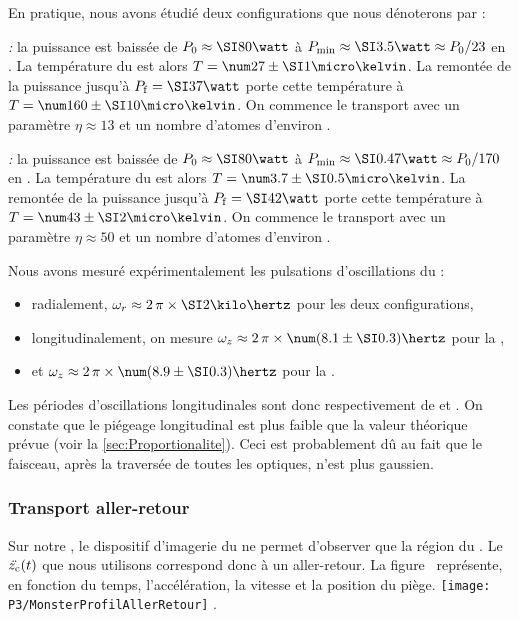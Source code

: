 \vspace{5pt}
\noindent En pratique, nous avons étudié deux configurations que nous dénoterons par :
\begin{ditemize}
	\item \emph{\confa:} la puissance est baissée de $P_0\approx\W{80}$ à $\Pmin\approx\W{3.5}\approx\ttfrac{P_0}{23}$ en . La température du \n est alors $T=\microKpm{27}{1}$. La remontée de la puissance jusqu'à $\Ptrans=\W{37}$ porte cette température à $T=\microKpm{160}{10}$. On commence le transport avec un paramètre $\eta\approx13$ et un nombre d'atomes d'environ .
	\item \emph{\confb:} la puissance est baissée de $P_0\approx\W{80}$ à $\Pmin\approx\W{0.47}\approx\ttfrac{P_0}{170}$ en . La température du \n est alors $T=\microKpm{3.7}{0.5}$. La remontée de la puissance jusqu'à $\Ptrans=\W{42}$ porte cette température à $T=\microKpm{43}{2}$. On commence le transport avec un paramètre $\eta\approx50$ et un nombre d'atomes d'environ .
\end{ditemize}
Nous avons mesuré expérimentalement les pulsations d'oscillations du \pd:
\begin{itemize}
	\item radialement, $\PulsTrans\approx 2\,\pi\times\kHz{2}$ pour les deux configurations,
	\item longitudinalement, on mesure $\PulsLong\approx 2\,\pi\times\Hzpm{(8.1}{0.3)}$ pour la \confa, 
	\item et $\PulsLong\approx2\,\pi\times\Hzpm{(8.9}{0.3)}$ pour la \confb.
\end{itemize}
Les périodes d'oscillations longitudinales sont donc respectivement de  et . On constate que le piégeage longitudinal est plus faible que la valeur théorique prévue (voir la \autoref{sec:Proportionalite}). Ceci est probablement dû au fait que le faisceau, après la traversée de toutes les optiques, n'est plus gaussien.


\casse

\subsubsection{Transport aller-retour}
Sur notre \setup, le dispositif d'imagerie du \nat ne permet d'observer que la région du \pmo.
Le \pacc ${\ddot{{z_{\rm c}}}}(t)$ que nous utilisons correspond donc à un aller-retour. 
\noindent
La figure~ représente, en fonction du temps, l'accélération, la vitesse et la position du piège. 
%
\bfighs
\texttt{[image: P3/MonsterProfilAllerRetour]}
.
\label{fig:ProfilAllerRetour}
\efigh

